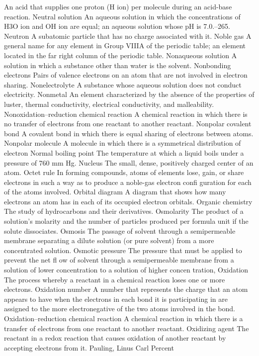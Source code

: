 \documentclass[10pt, roman]{article}
\begin{document}
An acid that supplies one proton (H ion) per molecule during an acid-base reaction. Neutral solution An aqueous solution in which the concentrations of H3O ion and OH ion are equal; an aqueous solution whose pH is 
7.0.–265. Neutron A subatomic particle that has no charge associated with it. Noble gas A general name for any element in Group VIIIA of the periodic table; an element located in the far right column of the periodic 
table. Nonaqueous solution A solution in which a substance other than water is the solvent. Nonbonding electrons Pairs of valence electrons on an atom that are not involved in electron sharing. Nonelectrolyte A 
substance whose aqueous solution does not conduct electricity. Nonmetal An element characterized by the absence of the properties of luster, thermal conductivity, electrical conductivity, and malleability. 
Nonoxidation–reduction chemical reaction A chemical reaction in which there is no transfer of electrons from one reactant to another reactant. Nonpolar covalent bond A covalent bond in which there is equal sharing of 
electrons between atoms. Nonpolar molecule A molecule in which there is a symmetrical distribution of electron Normal boiling point The temperature at which a liquid boils under a pressure of 760 mm Hg. Nucleus The 
small, dense, positively charged center of an atom. Octet rule In forming compounds, atoms of elements lose, gain, or share electrons in such a way as to produce a noble-gas electron confi guration for each of the 
atoms involved. Orbital diagram A diagram that shows how many electrons an atom has in each of its occupied electron orbitals. Organic chemistry The study of hydrocarbons and their derivatives. Osmolarity The 
product of a solution’s molarity and the number of particles produced per formula unit if the solute dissociates. Osmosis The passage of solvent through a semipermeable membrane separating a dilute solution (or 
pure solvent) from a more concentrated solution. Osmotic pressure The pressure that must be applied to prevent the net fl ow of solvent through a semipermeable membrane from a solution of lower concentration to a 
solution of higher concen tration, Oxidation The process whereby a reactant in a chemical reaction loses one or more electrons. Oxidation number A number that represents the charge that an atom appears to have when 
the electrons in each bond it is participating in are assigned to the more electronegative of the two atoms involved in the bond. Oxidation–reduction chemical reaction A chemical reaction in which there is a 
transfer of electrons from one reactant to another reactant. Oxidizing agent The reactant in a redox reaction that causes oxidation of another reactant by accepting electrons from it. Pauling, Linus Carl Percent 
\end{document}
